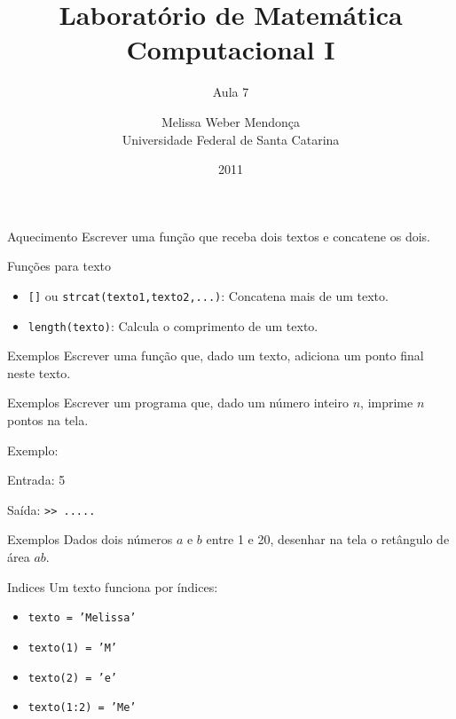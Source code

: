 \documentclass[hyperref={pdfpagelabels=false}]{beamer}
\title{Laboratório de Matemática Computacional I}
\subtitle{Aula 7}
\author[M. Weber Mendonça]{Melissa Weber Mendonça\\
Universidade Federal de Santa Catarina}
\date{2011}
\begin{document}
\setmonofont{Inconsolata}

\begin{frame}
  \titlepage
\end{frame}

\begin{frame}{Aquecimento}
	Escrever uma função que receba dois textos e concatene os dois.
	
\end{frame}

\begin{frame}{Funções para texto}
  \begin{itemize} 
  \item {\texttt{[]}} ou {\texttt{strcat(texto1,texto2,...)}}: Concatena
    mais de um texto.
  \item {\texttt{length(texto)}}: Calcula o comprimento de um texto. 
  \end{itemize}
\end{frame}

\begin{frame}{Exemplos}
	Escrever uma função que, dado um texto, adiciona um ponto final neste texto.
  
\end{frame}

\begin{frame}{Exemplos} 
  Escrever um programa que, dado um número inteiro $n$, imprime $n$ pontos na tela.
  
  Exemplo:

  \qquad Entrada: 5

  \qquad Saída: {\texttt{>> .....}}
  
\end{frame}

\begin{frame}{Exemplos}
  Dados dois números $a$ e $b$ entre 1 e 20, desenhar na tela o retângulo de área $ab$.
  
\end{frame}

\begin{frame}{Indices}
   Um texto funciona por índices: 
   \begin{itemize}
   \item \texttt{texto = 'Melissa'}
   \item \texttt{texto(1) = 'M'}
   \item \texttt{texto(2) = 'e'}
   \item \texttt{texto(1:2) = 'Me'}
   \end{itemize}
\end{frame}
\end{document}
